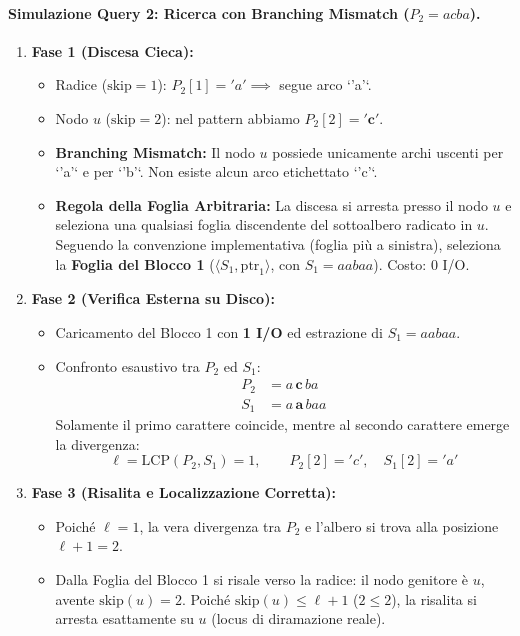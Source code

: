 \paragraph{Simulazione Query 2: Ricerca con Branching Mismatch ($P_2 = acba$).}
\begin{enumerate}
  \item \textbf{Fase 1 (Discesa Cieca):}
  \begin{itemize}
    \item Radice ($\text{skip} = 1$): $P_2[1] = 'a' \implies$ segue arco `'a'`.
    \item Nodo $u$ ($\text{skip} = 2$): nel pattern abbiamo $P_2[2] = \mathbf{'c'}$.
    \item \textbf{Branching Mismatch:} Il nodo $u$ possiede unicamente archi uscenti per `'a'` e per `'b'`. Non esiste alcun arco etichettato `'c'`.
    \item \textbf{Regola della Foglia Arbitraria:} La discesa si arresta presso il nodo $u$ e seleziona una qualsiasi foglia discendente del sottoalbero radicato in $u$. Seguendo la convenzione implementativa (foglia pi\`u a sinistra), seleziona la \textbf{Foglia del Blocco 1} ($\langle S_1, \text{ptr}_1 \rangle$, con $S_1 = aabaa$). Costo: $0$ I/O.
  \end{itemize}
  \item \textbf{Fase 2 (Verifica Esterna su Disco):}
  \begin{itemize}
    \item Caricamento del Blocco 1 con \textbf{1 I/O} ed estrazione di $S_1 = aabaa$.
    \item Confronto esaustivo tra $P_2$ ed $S_1$:
    \begin{align*}
      P_2 &= a \, \mathbf{c} \, ba \\
      S_1 &= a \, \mathbf{a} \, baa
    \end{align*}
    Solamente il primo carattere coincide, mentre al secondo carattere emerge la divergenza:
    \begin{equation}
      \ell = \text{LCP}(P_2, S_1) = 1, \qquad P_2[2] = 'c', \quad S_1[2] = 'a'
    \end{equation}
  \end{itemize}
  \item \textbf{Fase 3 (Risalita e Localizzazione Corretta):}
  \begin{itemize}
    \item Poich\'e $\ell = 1$, la vera divergenza tra $P_2$ e l'albero si trova alla posizione $\ell + 1 = 2$.
    \item Dalla Foglia del Blocco 1 si risale verso la radice: il nodo genitore \`e $u$, avente $\text{skip}(u) = 2$. Poich\'e $\text{skip}(u) \le \ell + 1$ ($2 \le 2$), la risalita si arresta esattamente su $u$ (locus di diramazione reale).

\end{itemize}
\end{enumerate}

